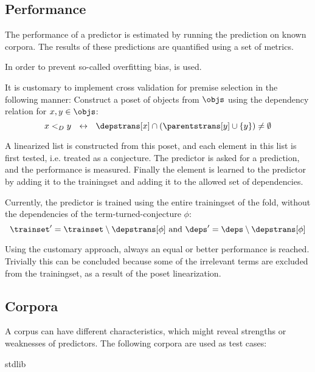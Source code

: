 \subsection{Performance}
The performance of a predictor is estimated by running the prediction on known corpora.
The results of these predictions are quantified using a set of metrics.

In order to prevent so-called overfitting bias, \crossvalidation is used.



It is customary to implement cross validation for premise selection in the following manner:
Construct a poset of objects from $\objs$ using the dependency relation for $x, y \in \objs$:
\[
	x <_D y ~~\leftrightarrow~~ \depstrans[x] \cap (\parentstrans[y] \cup \{y\}) \neq \emptyset
\]

A linearized list is constructed from this poset, and each element in this list is first tested, i.e. treated as a conjecture.
The predictor is asked for a prediction, and the performance is measured.
Finally the element is learned to the predictor by adding it to the trainingset and adding it to the allowed set of dependencies.

Currently, the predictor is trained using the entire trainingset of the fold, without the dependencies of the term-turned-conjecture $\phi$:
\[
	\trainset' = \trainset \setminus \depstrans[\phi] ~\text{and}~ \deps' = \deps \setminus \depstrans[\phi]
\]

Using the customary approach, always an equal or better performance is reached.
Trivially this can be concluded because some of the irrelevant terms are excluded from the trainingset, as a result of the poset linearization.

\subsection{Corpora}
A corpus can have different characteristics, which might reveal strengths or weaknesses of predictors.
The following corpora are used as test cases:

\begin{description}
	\item[\coq stdlib]
	\item[\compcert]
    \item[\formalin]
    \item[\corn]
    \item[\mathcomp]
\end{description}

